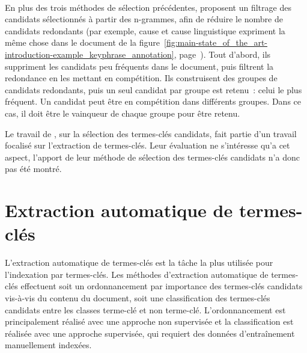     ~\\En plus des trois méthodes de sélection précédentes,
     proposent un filtrage
    des candidats sélectionnés à partir des n-grammes, afin de réduire le nombre
    de candidats redondants (par exemple, \og{}cause\fg{} et \og{}cause
    linguistique\fg{} expriment la même chose dans le document de la
    figure~\ref{fig:main-state_of_the_art-introduction-example_keyphrase_annotation},
    page~\pageref{fig:main-state_of_the_art-introduction-example_keyphrase_annotation}).
    Tout d'abord, ils suppriment les candidats peu fréquents dans le document,
    puis filtrent la redondance en les mettant en compétition. Ils construisent
    des groupes de candidats redondants, puis un seul candidat par groupe est
    retenu~: celui le plus fréquent. Un candidat peut être en compétition dans
    différents groupes. Dans ce cas, il doit être le \og{}vainqueur\fg{} de
    chaque groupe pour être retenu.

    Le travail de , sur la
    sélection des termes-clés candidats, fait partie d'un travail focalisé sur
    l'extraction de termes-clés. Leur évaluation ne s'intéresse qu'a cet aspect,
    l'apport de leur méthode de sélection des termes-clés candidats n'a donc pas
    été montré.


  \section{Extraction automatique de termes-clés}
  \label{sec:main-state_of_the_art-automatic_keyphrase_extraction}
    L'extraction automatique de termes-clés est la tâche la plus utilisée pour
    l'indexation par termes-clés. Les méthodes d'extraction automatique de
    termes-clés effectuent soit un ordonnancement par importance des termes-clés
    candidats vis-à-vis du contenu du document, soit une classification des
    termes-clés candidats entre les classes \og{}terme-clé\fg{} et \og{}non
    terme-clé\fg{}. L'ordonnancement est principalement réalisé avec une
    approche non supervisée et la classification est réalisée avec une approche
    supervisée, qui requiert des données d'entraînement manuellement indexées.

